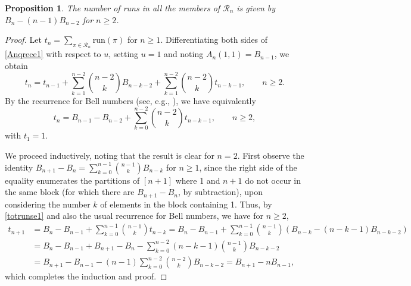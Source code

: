 \documentclass[11pt,a4paper]{article}
\newtheorem{proposition}{Proposition}[section]
\begin{document}
\begin{proposition}\label{totruns}
The number of runs in all the members of $\mathcal{R}_n$ is given by $B_n-(n-1)B_{n-2}$ for $n \geq 2$.
\end{proposition}
\begin{proof}
Let $t_n=\sum_{\pi \in \mathcal{R}_n}\text{run}(\pi)$ for $n \geq 1$. Differentiating both sides of \eqref{Anqrece1} with respect to $u$, setting $u=1$ and noting $A_n(1,1)=B_{n-1}$, we obtain
$$t_n=t_{n-1}+\sum_{k=1}^{n-2}\binom{n-2}{k}B_{n-k-2}+\sum_{k=1}^{n-2}\binom{n-2}{k}t_{n-k-1}, \qquad n \geq 2.$$
By the recurrence for Bell numbers (see, e.g., \cite[p.\,34]{Stan}), we have equivalently
\begin{equation}\label{totrunse1}
t_n=B_{n-1}-B_{n-2}+\sum_{k=0}^{n-2}\binom{n-2}{k}t_{n-k-1}, \qquad n \geq 2,
\end{equation}
with $t_1=1$.

We proceed inductively, noting that the result is clear for $n=2$.  First observe the identity $B_{n+1}-B_n=\sum_{k=0}^{n-1}\binom{n-1}{k}B_{n-k}$ for $n\geq 1$, since the right side of the equality enumerates the partitions of $[n+1]$  where 1 and $n+1$ do not occur in the same block (for which there are $B_{n+1}-B_n$, by subtraction), upon considering the number $k$ of elements in the block containing 1.  Thus, by \eqref{totrunse1} and also the usual recurrence for Bell numbers, we have for $n \geq 2$,
\begin{align*}
t_{n+1}&=B_n-B_{n-1}+\sum_{k=0}^{n-1}\binom{n-1}{k}t_{n-k}=B_n-B_{n-1}+\sum_{k=0}^{n-1}\binom{n-1}{k}\left(B_{n-k}-(n-k-1)B_{n-k-2}\right)\\
&=B_n-B_{n-1}+B_{n+1}-B_n-\sum_{k=0}^{n-2}(n-k-1)\binom{n-1}{k}B_{n-k-2}\\
&=B_{n+1}-B_{n-1}-(n-1)\sum_{k=0}^{n-2}\binom{n-2}{k}B_{n-k-2}=B_{n+1}-nB_{n-1},
\end{align*}
which completes the induction and proof.
\end{proof}
\end{document}
